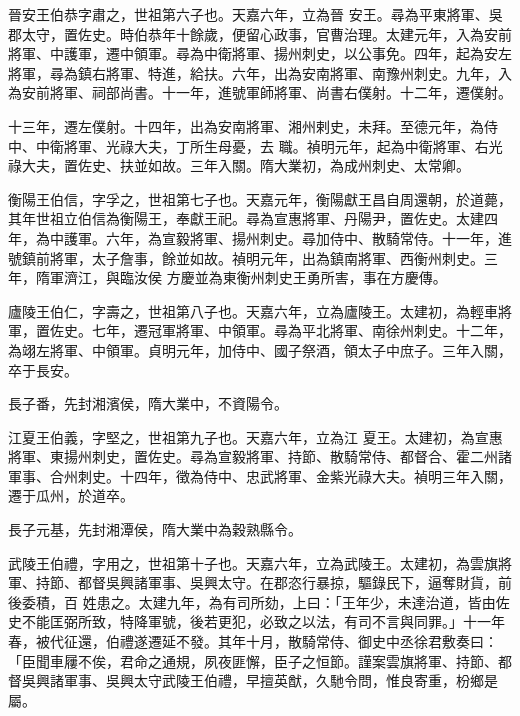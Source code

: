 \begin{pinyinscope}
 晉安王伯恭字肅之，世祖第六子也。天嘉六年，立為晉
 安王。尋為平東將軍、吳郡太守，置佐史。時伯恭年十餘歲，便留心政事，官曹治理。太建元年，入為安前將軍、中護軍，遷中領軍。尋為中衛將軍、揚州刺史，以公事免。四年，起為安左將軍，尋為鎮右將軍、特進，給扶。六年，出為安南將軍、南豫州刺史。九年，入為安前將軍、祠部尚書。十一年，進號軍師將軍、尚書右僕射。十二年，遷僕射。



 十三年，遷左僕射。十四年，出為安南將軍、湘州剌史，未拜。至德元年，為侍中、中衛將軍、光祿大夫，丁所生母憂，去
 職。禎明元年，起為中衛將軍、右光祿大夫，置佐史、扶並如故。三年入關。隋大業初，為成州刺史、太常卿。



 衡陽王伯信，字孚之，世祖第七子也。天嘉元年，衡陽獻王昌自周還朝，於道薨，其年世祖立伯信為衡陽王，奉獻王祀。尋為宣惠將軍、丹陽尹，置佐史。太建四年，為中護軍。六年，為宣毅將軍、揚州刺史。尋加侍中、散騎常侍。十一年，進號鎮前將軍，太子詹事，餘並如故。禎明元年，出為鎮南將軍、西衡州刺史。三年，隋軍濟江，與臨汝侯
 方慶並為東衡州刺史王勇所害，事在方慶傳。



 廬陵王伯仁，字壽之，世祖第八子也。天嘉六年，立為廬陵王。太建初，為輕車將軍，置佐史。七年，遷冠軍將軍、中領軍。尋為平北將軍、南徐州刺史。十二年，為翊左將軍、中領軍。貞明元年，加侍中、國子祭酒，領太子中庶子。三年入關，卒于長安。



 長子番，先封湘濱侯，隋大業中，不資陽令。



 江夏王伯義，字堅之，世祖第九子也。天嘉六年，立為江
 夏王。太建初，為宣惠將軍、東揚州刺史，置佐史。尋為宣毅將軍、持節、散騎常侍、都督合、霍二州諸軍事、合州刺史。十四年，徵為侍中、忠武將軍、金紫光祿大夫。禎明三年入關，遷于瓜州，於道卒。



 長子元基，先封湘潭侯，隋大業中為穀熟縣令。



 武陵王伯禮，字用之，世祖第十子也。天嘉六年，立為武陵王。太建初，為雲旗將軍、持節、都督吳興諸軍事、吳興太守。在郡恣行暴掠，驅錄民下，逼奪財貨，前後委積，百
 姓患之。太建九年，為有司所劾，上曰：「王年少，未達治道，皆由佐史不能匡弼所致，特降軍號，後若更犯，必致之以法，有司不言與同罪。」十一年春，被代征還，伯禮遂遷延不發。其年十月，散騎常侍、御史中丞徐君敷奏曰：「臣聞車屨不俟，君命之通規，夙夜匪懈，臣子之恒節。謹案雲旗將軍、持節、都督吳興諸軍事、吳興太守武陵王伯禮，早擅英猷，久馳令問，惟良寄重，枌鄉是屬。




\end{pinyinscope}
